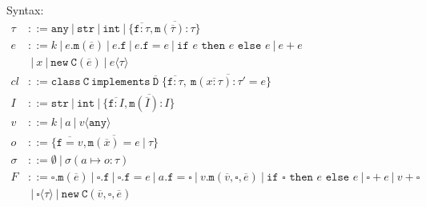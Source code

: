 \documentclass{report}
\begin{document}
\newcommand{\class}{\ensuremath{\xt{class}}\xspace}
\newcommand{\G}{\Gamma}
\renewcommand{\int}{\texttt{int}}
\newcommand{\coerce}{\Rightarrow} %
\newcommand{\str}{\texttt{str}}
\newcommand{\any}{\texttt{any}}   %
\newcommand{\this}{\texttt{this}}
\newcommand{\ifthenelse}[3]{\texttt{if }#1\texttt{ then }#2\texttt{ else }#3}
\newcommand{\cast}[1]{\langle #1\rangle} 
\newcommand{\xt}[1]{\texttt{#1}}
\newcommand{\creduce}{\longrightarrow_{cr}}  %
\newcommand{\ereduce}{\longrightarrow_{e}}   %
\newcommand{\stepsto}{\longrightarrow}        %
\newcommand{\intv}[1]{\xt{int}[#1]}
\newcommand{\strv}[1]{\xt{str}[#1]}
\newcommand{\tlate}{\rightsquigarrow}
\newcommand{\s}{\sigma}
\renewcommand{\sc}{\mu}
\renewcommand{\t}{\tau}
\newcommand{\B}{\ensuremath{~|~}\xspace}
\newcommand{\new}{\ensuremath{\texttt{new}}\xspace}
\newcommand{\NEW}[2]{\ensuremath{  \new ~ #1 ( #2 )}\xspace}
\renewcommand{\bar}[1]{\ensuremath{\overline{ #1} }\xspace}
\newcommand{\m}{\ensuremath{\xt{m}}\xspace}
\newcommand{\f}{\ensuremath{\xt{f}}\xspace}
\newcommand{\C}{\ensuremath{\xt{C}}\xspace}
\newcommand{\D}{\ensuremath{\xt{D}}\xspace}
\newcommand{\is}{\mapsto}
\newcommand{\cl}{\mathit{cl}\xspace}
\newcommand{\implements}{\xt{implements}\xspace}
\newcommand{\CLASS}[3]{ \ensuremath{  \xt{class}~#1~\implements~#2\;\{ #3 \}}\xspace} 
\newcommand{\MDEF}[4] { #1( #2 ):#3 = #4}
\newcommand{\MTYPE}[3] { #1( #2 ):#3}
\newcommand{\MVAL}[3] { #1( #2 ) = #3}
\newcommand{\Gdash}{\G\vdash}



Syntax:
\begin{align*}
\t &::= \any \B  \str \B  \int \B  \{\bar{\f :\t},\bar{\m (\bar{\t}):\t}\}\\
e &::= k \B  e.\m(\bar{e}) \B e.\f \B e.\f  = e \B  \ifthenelse{e}{e}{e}\B e + e \\
&\B x\B \NEW \C {\bar{e}} \B  e\cast{\t}\\
\cl &::= \CLASS \C {\bar \D} { \bar{ \f : \t }, ~ \bar{ \MDEF{\m}{\bar{x :\t}}{\t'}{e} } } \\
I &::= \str \B  \int \B  \{\bar{\f :I},\bar{\m (\bar{I}):I}\}\\
v &::= k \B a \B  v\cast{\any}\\
\mathit{o} &::= \{\bar{\f=v}, \bar{\m(\bar x) = e} \B \t\}\\
\s &::= \emptyset \B  \s( a \is o : \t )\\
F &::=    \square.\m(\bar e) 
   \B     \square.\f
   \B     \square.\f = e
   \B     a.\f = \square
   \B     v.\m(\bar v,\square, \bar e) 
   \B     \ifthenelse{\square}{e}{e} 
   \B     \square + e 
   \B      v + \square\\
   &\B     \square\cast{\tau}
\B \NEW  \C {\bar{v},\square,\bar{e}}\\
\end{align*}
\end{document}
